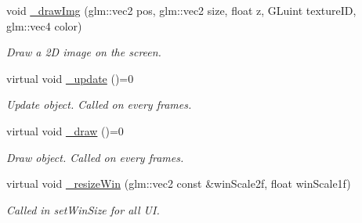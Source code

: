 \begin{DoxyCompactItemize}
void \hyperlink{class_a_base_u_i_ace787d9cf83b1e659a82c470f5ce953c}{\+\_\+draw\+Img} (glm\+::vec2 pos, glm\+::vec2 size, float z, G\+Luint texture\+ID, glm\+::vec4 color)
\begin{DoxyCompactList}\small\item\em Draw a 2D image on the screen. \end{DoxyCompactList}\item 
virtual void \hyperlink{class_a_base_u_i_ad4526888fd6a37de4086ba2a1e362759}{\+\_\+update} ()=0
\begin{DoxyCompactList}\small\item\em Update object. Called on every frames. \end{DoxyCompactList}\item 
virtual void \hyperlink{class_a_base_u_i_a3331159cbf9926557afa79e4e3eee256}{\+\_\+draw} ()=0
\begin{DoxyCompactList}\small\item\em Draw object. Called on every frames. \end{DoxyCompactList}\item 
virtual void \hyperlink{class_a_base_u_i_a1bf435b41e6628dd84633925198e0c8c}{\+\_\+resize\+Win} (glm\+::vec2 const \&win\+Scale2f, float win\+Scale1f)
\begin{DoxyCompactList}\small\item\em Called in set\+Win\+Size for all UI. \end{DoxyCompactList}\end{DoxyCompactItemize}
